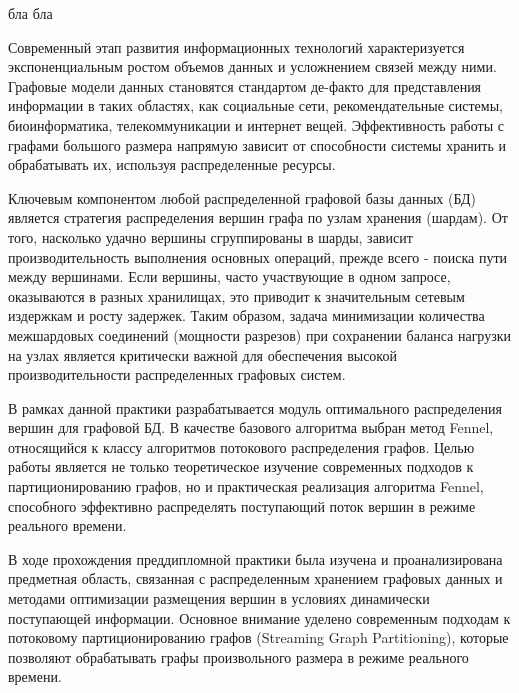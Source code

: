 \documentclass[a4paper, 12pt]{article}
\begin{document}

\pagebreak
бла бла
\newpage
\tableofcontents
\newpage
{}

Современный этап развития информационных технологий характеризуется экспоненциальным ростом объемов данных и усложнением связей между ними. Графовые модели данных становятся стандартом де-факто для представления информации в таких областях, как социальные сети, рекомендательные системы, биоинформатика, телекоммуникации и интернет вещей. Эффективность работы с графами большого размера напрямую зависит от способности системы хранить и обрабатывать их, используя распределенные ресурсы.

Ключевым компонентом любой распределенной графовой базы данных (БД) является стратегия распределения вершин графа по узлам хранения (шардам). От того, насколько удачно вершины сгруппированы в шарды, зависит производительность выполнения основных операций, прежде всего - поиска пути между вершинами. Если вершины, часто участвующие в одном запросе, оказываются в разных хранилищах, это приводит к значительным сетевым издержкам и росту задержек. Таким образом, задача минимизации количества межшардовых соединений (мощности разрезов) при сохранении баланса нагрузки на узлах является критически важной для обеспечения высокой производительности распределенных графовых систем.

В рамках данной практики разрабатывается модуль оптимального распределения вершин для графовой БД. В качестве базового алгоритма выбран метод Fennel, относящийся к классу алгоритмов потокового распределения графов. Целью работы является не только теоретическое изучение современных подходов к партиционированию графов, но и практическая реализация алгоритма Fennel, способного эффективно распределять поступающий поток вершин в режиме реального времени.
\newpage


\newpage
{}

В ходе прохождения преддипломной практики была изучена и проанализирована предметная область, связанная с распределенным хранением графовых данных и методами оптимизации размещения вершин в условиях динамически поступающей информации. Основное внимание уделено современным подходам к потоковому партиционированию графов (Streaming Graph Partitioning), которые позволяют обрабатывать графы произвольного размера в режиме реального времени.
\end{document}
